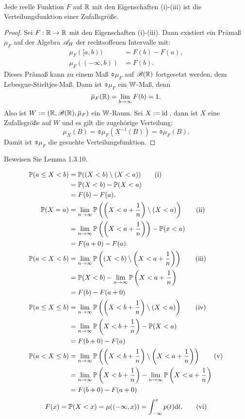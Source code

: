 Jede reelle Funktion $F$ auf $\mathbb{R}$ mit den Eigenschaften (i)-(iii) ist die
Verteilungsfunktion einer Zufallsgröße.

\begin{proof}
  Sei $F: \mathbb{R} \to \mathbb{R}$ mit den Eigenschaften (i)-(iii). Dann existiert ein
  Prämaß $\mu_F$ auf der Algebra $\mathscr{A}_H$ der rechtsoffenen Intervalle mit:
  \begin{align*}
    \mu_F( [a,b) ) &= F(b) - F(a), \\
    \mu_F((-\infty,b)) &= F(b).
  \end{align*}
  Dieses Prämaß kann zu einem Maß $\obar{\mu}_F$ auf $\mathscr{B}(\mathbb{R})$ fortgesetzt
  werden, dem Lebesgue-Stieltjes-Maß. Dann ist $\obar{\mu}_F$ ein $\mathbb{W}$-Maß,
  denn
  \[ \obar{\mu}_F(\real) = \lim_{b \to \infty} F(b) = 1. \]
  Also ist $W := (\real, \borel(\real), \obar{\mu}_F)$ ein $\mathbb{W}$-Raum. Sei $X :=
  \mathrm{id}\,$, dann ist $X$ eine Zufallsgröße auf $W$ und es gilt die zugehörige
  Verteilung:
  \[ \mu_X(B) = \obar{\mu}_F(X^{-1}(B)) = \obar{\mu}_F(B). \]
  Damit ist $\obar{\mu}_F$ die gesuchte Verteilungsfunktion.
\end{proof}

\begin{aufg}
  Beweisen Sie Lemma 1.3.10.
\end{aufg}
\begin{align*}
  \mathbb{P}(a \le X < b )
  &= \mathbb{P}((X<b)\setminus(X<a)) \tag{i} \\
  &= \mathbb{P}(X<b) - \mathbb{P}(X<a) \\
  &= F(b) - F(a). \\
  \mathbb{P}(X = a)
  &= \lim_{n \to \infty} \mathbb{P} \left( \left( X < a + \frac{1}{n} \right) \setminus (X<a) \right) \tag{ii} \\
  &= \lim_{n \to \infty} \mathbb{P} \left( \left( X < a + \frac{1}{n} \right) \right) - \mathbb{P}(x<a) \\
  &= F(a+0) - F(a). \\
  \mathbb{P}(a < X < b)
  &= \lim_{n \to \infty} \mathbb{P} \left( (X<b) \setminus \left( X < a + \frac{1}{n} \right) \right) \tag{iii} \\
  &= \mathbb{P}(X < b) - \lim_{n \to \infty} \mathbb{P} \left( X < a + \frac{1}{n} \right) \\
  &= F(b) - F(a+0) \\
  \mathbb{P}(a \le X \le b)
  &= \lim_{n \to \infty} \mathbb{P} \left( \left(X<b + \frac{1}{n} \right) \setminus ( X < a ) \right) \tag{iv} \\
  &= \lim_{n \to \infty} \mathbb{P} \left( X < b + \frac{1}{n} \right) - \mathbb{P}(X<a) \\
  &= F(b+0) - F(a) \\
  \mathbb{P}(a < X \le b)
  &= \lim_{n \to \infty} \mathbb{P} \left( \left(X<b + \frac{1}{n} \right) \setminus \left(X < a + \frac{1}{n} \right) \right) \tag{v} \\
  &= \lim_{n \to \infty} \mathbb{P} \left( X < b + \frac{1}{n} \right) -
    \lim_{n \to \infty} \mathbb{P} \left( X < a + \frac{1}{n} \right) \\
  &= F(b+0) - F(a+0)
\end{align*}
\[ F(x) = \mathbb{P}(X < x) = \mu((-\infty,x)) = \int_{-\infty}^x p(t) \mathrm{d}
  t. \tag{vi} \]

